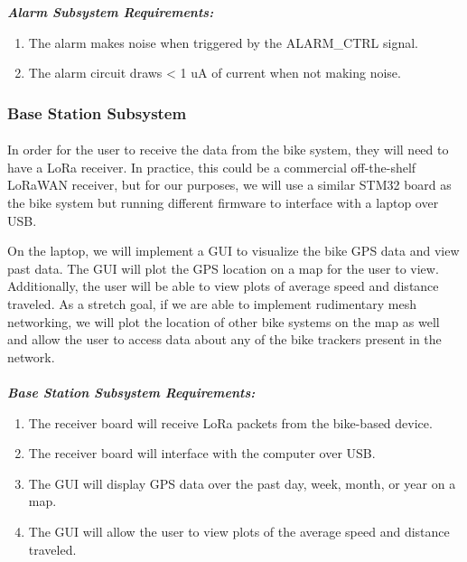 \documentclass{article}
\begin{document}
\textit{\textbf{Alarm Subsystem Requirements:}}

\begin{enumerate}
	\item The alarm makes noise when triggered by the ALARM\_CTRL signal. 
	\item The alarm circuit draws < 1 uA of current when not making noise.
\end{enumerate}




\subsubsection{Base Station Subsystem} 

\paragraph{} 
In order for the user to receive the data from the bike system, they will need to have a LoRa receiver. In practice, this could be a commercial off-the-shelf LoRaWAN receiver, but for our purposes, we will use a similar STM32 board as the bike system but running different firmware to interface with a laptop over USB. 

On the laptop, we will implement a GUI to visualize the bike GPS data and view past data. The GUI will plot the GPS location on a map for the user to view. Additionally, the user will be able to view plots of average speed and distance traveled. As a stretch goal, if we are able to implement rudimentary mesh networking, we will plot the location of other bike systems on the map as well and allow the user to access data about any of the bike trackers present in the network. 


\paragraph{} 
\textit{\textbf{Base Station Subsystem Requirements:}}

\begin{enumerate}
	\item The receiver board will receive LoRa packets from the bike-based device. 
	\item The receiver board will interface with the computer over USB.
	\item The GUI will display GPS data over the past day, week, month, or year on a map. 
	\item The GUI will allow the user to view plots of the average speed and distance traveled.
\end{enumerate}
\end{document}
